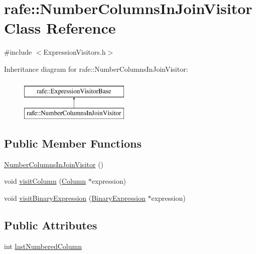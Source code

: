 \hypertarget{classrafe_1_1_number_columns_in_join_visitor}{\section{rafe\+:\+:Number\+Columns\+In\+Join\+Visitor Class Reference}
\label{classrafe_1_1_number_columns_in_join_visitor}
}


{\ttfamily \#include $<$Expression\+Visitors.\+h$>$}

Inheritance diagram for rafe\+:\+:Number\+Columns\+In\+Join\+Visitor\+:\begin{figure}[H]
\begin{center}
\leavevmode
\includegraphics[height=2.000000cm]{classrafe_1_1_number_columns_in_join_visitor}
\end{center}
\end{figure}
\subsection*{Public Member Functions}
\begin{DoxyCompactItemize}
\item 
\hyperlink{classrafe_1_1_number_columns_in_join_visitor_a7139834faf5f6814ff8d48c05ec0f260}{Number\+Columns\+In\+Join\+Visitor} ()
\item 
void \hyperlink{classrafe_1_1_number_columns_in_join_visitor_a0a9ea8d0e184365f7f869452e13b8a63}{visit\+Column} (\hyperlink{classrafe_1_1_column}{Column} $\ast$expression)
\item 
void \hyperlink{classrafe_1_1_number_columns_in_join_visitor_a56c533c28f9948a6fcc0e8856a7b19e4}{visit\+Binary\+Expression} (\hyperlink{classrafe_1_1_binary_expression}{Binary\+Expression} $\ast$expression)
\end{DoxyCompactItemize}
\subsection*{Public Attributes}
\begin{DoxyCompactItemize}
\item 
int \hyperlink{classrafe_1_1_number_columns_in_join_visitor_a332114b3e616548b03a47c34e65f386a}{last\+Numbered\+Column}
\end{DoxyCompactItemize}


